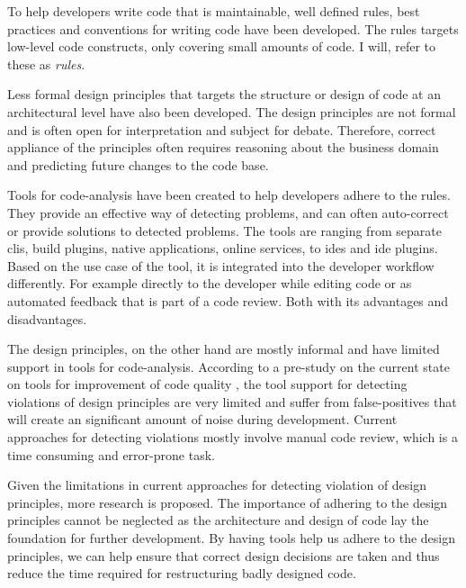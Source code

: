 \documentclass{report}
\begin{document}
To help developers write code that is maintainable, well defined rules, best practices and conventions for writing code have been developed. The rules targets low-level code constructs, only covering small amounts of code. I will, refer to these as \textit{rules}.

Less formal design principles that targets the structure or design of code at an architectural level have also been developed. The design principles are not formal and is often open for interpretation and subject for debate. Therefore, correct appliance of the principles often requires reasoning about the business domain and predicting future changes to the code base. 

Tools for code-analysis have been created to help developers adhere to the rules. They provide an effective way of detecting problems, and can often auto-correct or provide solutions to detected problems. The tools are ranging from separate \gls{cli}s, build plugins, native applications, online services, to \gls{ide}s and \gls{ide} plugins. Based on the use case of the tool, it is integrated into the developer workflow differently. For example directly to the developer while editing code or as automated feedback that is part of a code review. Both with its advantages and disadvantages.

The design principles, on the other hand are mostly informal and have limited support in tools for code-analysis. According to a pre-study on the current state on tools for improvement of code quality \cite{prestudy}, the tool support for detecting violations of design principles are very limited and suffer from false-positives that will create an significant amount of noise during development. Current approaches for detecting violations mostly involve manual code review, which is a time consuming and error-prone task.

Given the limitations in current approaches for detecting violation of design principles, more research is proposed. The importance of adhering to the design principles cannot be neglected as the architecture and design of code lay the foundation for further development. By having tools help us adhere to the design principles, we can help ensure that correct design decisions are taken and thus reduce the time required for restructuring badly designed code.  
\end{document}

